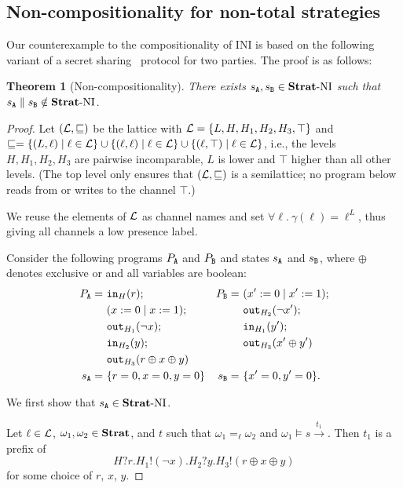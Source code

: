 \documentclass[preprint,5p,twocolumn]{elsarticle}
\newtheorem{theorem}{Theorem}
\begin{document}
\subsection{Non-compositionality for non-total strategies}

Our counterexample to the compositionality of INI is based on the following variant of a secret sharing~\cite{Shamir1979} protocol
for two parties. The proof is as follows:

\begin{theorem}[Non-compositionality]
  \label{thm:noncompositional}
  There exists $s_{\mathtt{A}}, s_{\mathtt{B}} \in \mathbf{Strat}\text{-}\mathrm{NI}$ such that $s_{\mathtt{A}} \parallel s_{\mathtt{B}} \notin \mathbf{Strat}\text{-}\mathrm{NI}$.
\end{theorem}
\begin{proof}
  Let $(\mathcal{L}, \sqsubseteq)$ be the lattice with $\mathcal{L} = \lbrace L, H, H_1, H_2, H_3, \top \rbrace$
  and $\sqsubseteq = \lbrace (L, \ell) \mid \ell \in \mathcal{L}\rbrace \cup \lbrace (\ell, \ell) \mid \ell \in \mathcal{L}\rbrace
  \cup \lbrace (\ell, \top) \mid \ell \in \mathcal{L}\rbrace$, i.e.,
  the levels $H, H_1, H_2, H_3$ are pairwise incomparable, $L$ is lower and $\top$ higher than all
  other levels. (The top level only ensures that $(\mathcal{L}, \sqsubseteq)$ is a semilattice; no
  program below reads from or writes to the channel $\top$.)

  We reuse the elements of $\mathcal{L}$ as channel names and set
  $\forall \ell.~\gamma(\ell) = \ell^L$, thus giving all channels a low presence label.
  
  Consider the following programs $P_{\mathtt{A}}$ and $P_{\mathtt{B}}$ and states $s_{\mathtt{A}}$ and $s_{\mathtt{B}}$, where
  $\oplus$ denotes exclusive or and all variables are boolean:
  \begin{align*}
    P_{\mathtt{A}} =~& \mathtt{in}_{H}(r); & P_{\mathtt{B}} =~ & (x' := 0 \mid x' := 1); \\
        &(x := 0 \mid x := 1); && \mathtt{out}_{H_2}(\neg x');\\
        &\mathtt{out}_{H_1}(\neg x); && \mathtt{in}_{H_1}(y'); \\
        & \mathtt{in}_{H_2}(y); && \mathtt{out}_{H_3}(x' \oplus y') \\
          & \mathtt{out}_{H_3}(r \oplus x \oplus y) \\
    s_{\mathtt{A}} =~& \lbrace r = 0, x = 0, y = 0\rbrace & s_{\mathtt{B}} =~& \lbrace x' = 0, y' = 0\rbrace.
  \end{align*}

  We first show that $s_{\mathtt{A}} \in \mathbf{Strat}\text{-}\mathrm{NI}$.

  Let $\ell \in \mathcal{L}$, $\omega_1, \omega_2 \in \mathbf{Strat}$, and $t$ such that $\omega_1 =_\ell \omega_2$
  and $\omega_1 \vDash s \xrightarrow{t_1}$. Then $t_1$ is a prefix of
  $$H?r.H_1!(\neg x).H_2?y.H_3!(r \oplus x \oplus y)$$
  for some choice of $r$, $x$, $y$.


\end{proof}
\end{document}
